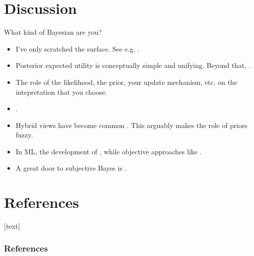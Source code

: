 \documentclass[10pt]{beamer}
\begin{document}
\section{Discussion}
\begin{frame}{What kind of Bayesian are you?}
\begin{itemize}
\item I've only scratched the surface. See e.g. \citep{May18}.
\item Posterior expected utility is conceptually simple and unifying. Beyond that, .
\item The role of the likelihood, the prior, your update mechanism, etc.  on the intepretation that you choose.
\item[\frownie] .
\item Hybrid views have become common \citep{Rob07,GCSDVR13}. This arguably makes the role of priors fuzzy.
\item In ML, the development of , while objective approaches like .
\item A great door to subjective Bayes is \citep{PaIn09}.
\end{itemize}
\end{frame}
  




\section*{References}
[text]%
\begin{frame}[allowframebreaks]
\frametitle{References}
\small
\printbibliography
\normalsize
\end{frame}
\end{document}
